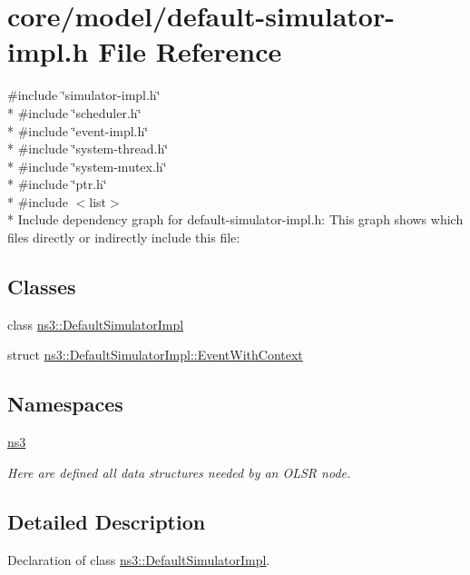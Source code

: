 \hypertarget{default-simulator-impl_8h}{}\section{core/model/default-\/simulator-\/impl.h File Reference}
\label{default-simulator-impl_8h}
{\ttfamily \#include \char`\"{}simulator-\/impl.\+h\char`\"{}}\\*
{\ttfamily \#include \char`\"{}scheduler.\+h\char`\"{}}\\*
{\ttfamily \#include \char`\"{}event-\/impl.\+h\char`\"{}}\\*
{\ttfamily \#include \char`\"{}system-\/thread.\+h\char`\"{}}\\*
{\ttfamily \#include \char`\"{}system-\/mutex.\+h\char`\"{}}\\*
{\ttfamily \#include \char`\"{}ptr.\+h\char`\"{}}\\*
{\ttfamily \#include $<$list$>$}\\*
Include dependency graph for default-\/simulator-\/impl.h\+:
This graph shows which files directly or indirectly include this file\+:
\subsection*{Classes}
\begin{DoxyCompactItemize}
\item 
class \hyperlink{classns3_1_1DefaultSimulatorImpl}{ns3\+::\+Default\+Simulator\+Impl}
\item 
struct \hyperlink{structns3_1_1DefaultSimulatorImpl_1_1EventWithContext}{ns3\+::\+Default\+Simulator\+Impl\+::\+Event\+With\+Context}
\end{DoxyCompactItemize}
\subsection*{Namespaces}
\begin{DoxyCompactItemize}
\item 
 \hyperlink{namespacens3}{ns3}
\begin{DoxyCompactList}\small\item\em Here are defined all data structures needed by an O\+L\+SR node. \end{DoxyCompactList}\end{DoxyCompactItemize}


\subsection{Detailed Description}
Declaration of class \hyperlink{classns3_1_1DefaultSimulatorImpl}{ns3\+::\+Default\+Simulator\+Impl}. 